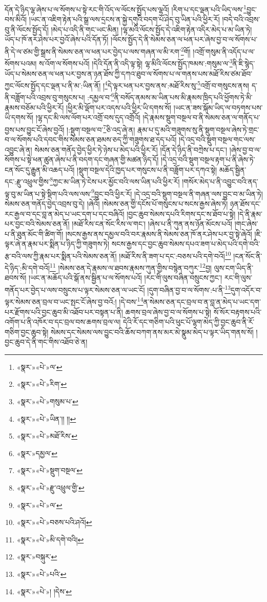 དོན་དེ་ཉིད་ལྷ་ཞེས་པ་ལ་སོགས་པ་སྟེ་རང་གི་འོད་ལ་ལོངས་སྤྱོད་པས་ལྷའོ། །རིག་པ་དང་ལྡན་པའི་ཡིད་ལས་\footnote{«སྣར་»«པེ་»ལ་}བྱུང་བས་མིའོ། །ཡང་ན་འཇིག་རྟེན་པའི་སྒྲ་ལས་དྲངས་ན་སྐྱེ་དགུའི་བདག་པོ་ཤེད་བུ་ཡིན་པའི་ཕྱིར་རོ། །བདེ་བའི་འབྲས་བུ་ནི་ལོངས་སྤྱོད་དོ། །མེད་པ་འདི་ནི་གང་ཡང་མིན། །ལྷ་མའི་ལོངས་སྤྱོད་དེ་འཇིག་རྟེན་འདིར་མེད་པ་མ་ཡིན་ཏེ། ཡོད་པ་ཁོ་ནར་ཤེས་པར་བྱའོ་ཞེས་པའི་དོན་ཏོ། །ལོངས་སྤྱོད་དེ་ནི་སེམས་ཅན་ལ་ཕན་པར་ཞེས་བྱ་བ་ལ་སོགས་པ་ནི་དེ་ལ་ཙམ་གྱི་སྒྲས་ནི་སེམས་ཅན་ལ་ཕན་པར་བྱེད་པ་ལས་གཞན་ལ་མི་རག་\footnote{«སྣར་»«པེ་»རིག་}གོ། །འགྲོ་གསུམ་ནི་འདོད་པ་ལ་སོགས་པའམ། ས་འོག་ལ་སོགས་པའོ། །དེའི་དོན་ནི་འདི་ལྟ་སྟེ། ལྷ་མིའི་ལོངས་སྤྱོད་ཁམས་:གསུམ་ལ་\footnote{«སྣར་»«པེ་»གསུམ་པ་}ནི་ཇི་སྙེད་ཡོད་པ་སེམས་ཅན་ལ་ཕན་པར་བྱས་ན་ཉན་ཐོས་ཀྱི་དཀའ་ཐུབ་ལ་སོགས་པ་ལ་གནས་པས་མཐོ་རིས་ཙམ་ཐོབ་ཀྱང་ལོངས་སྤྱོད་དང་ལྡན་པ་ནི་མ་:ཡིན་ནོ། །\footnote{«སྣར་»«པེ་»ཡིན་།། །།}དེ་ལྟར་ཕན་པར་བྱས་ནས་:མཐོ་རིས་སུ་\footnote{«སྣར་»«པེ་»མཐོ་རིས་}འགྲོ་བ་གསུངས་ནས། ད་ནི་བཟློག་པའི་འབྲས་བུ་གསུངས་པ། :དམྱལ་བ་\footnote{«སྣར་»དམྱལ་}ནི་བསོད་ནམས་མ་ཡིན་པས་མི་རྣམས་ཁྲིད་པའི་ཕྱོགས་ཏེ་མི་རྣམས་བཅོམ་པའི་ཕྱིར་རོ། །ཕྱིར་མི་ལྡོག་པར་འདས་པའི་ཕྱིར་ཡི་དགས་སོ། །ཡང་ན་ཟས་སྐོམ་ཡིད་ལ་བཏགས་པས་ཡི་དགས་སོ། །ལྷ་དང་མི་ལས་ལོག་པར་འགྲོ་བས་དུད་འགྲོའོ། །དེ་རྣམས་སྡུག་བསྔལ་བ་ནི་སེམས་ཅན་ལ་གནོད་པ་བྱས་པས་བྱུང་ངོ་ཞེས་བྱའོ། །:སྡུག་བསྔལ་བ་\footnote{«སྣར་»«པེ་»སྡུག་བསྔལ་}ཅི་འདྲ་ཞེ་ན། རྣམ་པ་དུ་མའི་གཟུགས་སུ་ནི་སྡུག་བསྔལ་ཞེས་ཏེ་གྲང་བ་ལ་སོགས་པའི་དབང་གིས་སེམས་ཅན་ཐམས་ཅད་ཀྱི་གཟུགས་ཐ་དད་པའོ། །དེ་འདྲ་བའི་སྡུག་བསྔལ་གང་ལས་འབྱུང་ཞེ་ན། སེམས་ཅན་གནོད་བྱེད་ཕྱིར་ཏེ་ཉེས་པ་མེད་པའི་ཕྱིར་རོ། །དོན་དེ་ཉིད་ནི་བཀྲེས་པ་དང་། །ཞེས་བྱ་བ་ལ་སོགས་པ་སྟེ་ཕན་ཚུན་ཞེས་པ་ནི་བདག་དང་གཞན་གྱི་མཚན་ཉིད་དོ། །དེ་འདྲ་བའི་སྡུག་བསྔལ་རྟག་པ་ནི་ཞེས་ཏེ་ངན་སོང་དུ་རྒྱུན་མི་འཆད་པའོ། །སྡུག་བསྔལ་དེའི་ཁྱད་པར་གསུངས་པ་ནི་བཟློག་པར་དཀའ་སྟེ། མཆོད་སྦྱིན་དང་:རྫུ་འཕྲུལ་གྱིས་\footnote{«སྣར་»«པེ་»རྫུ་འཕྲུལ་གྱི་}ཀྱང་མ་ཡིན་ཏེ་ངེས་པར་མྱོང་བའི་ལས་ཡིན་པའི་ཕྱིར་རོ། །གསོར་མེད་པ་ནི་འབྱུང་བའི་ནད་ལྟ་བུ་མ་ཡིན་པ་སྟེ་སྡིག་པའི་ལས་ལས་\footnote{«སྣར་»«པེ་»ལ་}བྱུང་བའི་ཕྱིར་རོ། །དེ་འདྲ་བའི་སྡུག་བསྔལ་ནི་གཞན་ལས་བྱུང་བ་མ་ཡིན་ཏེ། སེམས་ཅན་གནོད་བྱེད་འབྲས་བུ་དེ། །ཞེའོ། །སེམས་ཅན་གྱི་དངོས་པོ་གསུངས་པ་སངས་རྒྱས་ཞེས་ཏེ། ཉན་ཐོས་དང་རང་རྒྱལ་བ་དང་བླ་ན་མེད་པ་ཡང་དག་པ་དང་བཞིའོ། །བྱང་ཆུབ་སེམས་དཔའི་རིགས་དང་ས་ཐོབ་པ་སྟེ། །དེ་ནི་རྣམ་པར་བྱང་བའི་སེམས་ཅན་ནོ། །མཐོ་རིས་ངན་སོང་རིས་ལ་གང་། །ཞེས་པ་ནི་ཀུན་ནས་ཉོན་མོངས་པའོ། །གང་ཞེས་པ་ནི་ཐུན་མོང་གི་ཚིག་གོ། །སངས་རྒྱས་ནས་དམྱལ་བའི་བར་རྣམས་ནི་སེམས་ཅན་ཁོ་ནར་ཤེས་པར་བྱ་སྟེ་ཞེའོ། །ཇི་ལྟར་ཞེ་ན་རྣམ་པར་སྨིན་པ་ཉིད་ཀྱི་གཟུགས་ཏེ། སངས་རྒྱས་དང་བྱང་ཆུབ་སེམས་དཔའ་ཟག་པ་མེད་པའི་དགེ་བའི་རྩ་བའི་ལས་ཀྱི་རྣམ་པར་སྨིན་པའི་སེམས་ཅན་ནོ། །མཐོ་རིས་ནི་ཟག་པ་དང་:བཅས་པའི་དགེ་བའོ།\footnote{«སྣར་»«པེ་»བཅས་པའི་ཤའོ།} །ངན་སོང་ནི་དེ་ཉིད་:མི་དགེ་བའོ།\footnote{«སྣར་»«པེ་»མི་དགེ་བའི།} །སེམས་ཅན་དེ་རྣམས་ལ་ཐབས་རྣམས་ཀུན་གྱིས་བསྙེན་བཀུར་\footnote{«སྣར་»བསྐུར་}བྱ། ལུས་ངག་ཡིད་ནི་ཐབས་སོ། །ཡང་ན་མཆོད་པའི་སྒོ་ནས་སྦྱིན་པ་ལ་སོགས་པའོ། །རང་གི་ལུས་བཞིན་བསྲུངས་ཀྱང་། རང་གི་ལུས་གནོད་པར་བྱེད་པ་ལས་བསྲུངས་པ་ལྟར་སེམས་ཅན་ལ་ཡང་ངོ། །དུག་བཞིན་བྱ་བ་ལ་སོགས་:པ་ནི་\footnote{«སྣར་»«པེ་»པའི་}དུག་འདོར་བ་ལྟར་སེམས་ཅན་བྲལ་བ་ཡང་སྤང་ངོ་ཞེས་བྱ་བའོ:། །དེ་བས་\footnote{«སྣར་»«པེ་»། །དེས་}ན་སེམས་ཅན་དང་བྲལ་བ་ན་བླ་ན་མེད་པ་ཡང་དག་པར་རྫོགས་པའི་བྱང་ཆུབ་མི་འཐོབ་པར་བསྟན་པ་ནི། ཆགས་བྲལ་ཞེས་བྱ་བ་ལ་སོགས་པ་སྟེ། སོ་སོར་བརྟགས་པའི་འགོག་པ་ནི་འཁོར་བ་དང་བྲལ་བས་ཆགས་བྲལ་ལ། དེའི་རོ་དང་གཅིག་པའི་ཕུང་པོ་ལྷག་མེད་ཀྱི་བྱང་ཆུབ་ནི་རོ་གཅིག་བྱང་ཆུབ་སྟེ། སེམས་དང་སེམས་ལས་བྱུང་བའི་ཆོས་བཀག་ནས་མར་མེ་སྣུམ་མེད་པ་ལྟར་ཡིད་གནས་སོ། །བྱང་ཆུབ་དེ་ནི་གང་གིས་འཐོབ་ཅེ་ན། 